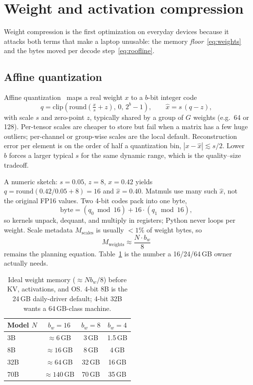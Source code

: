\section{Weight and activation compression}
\label{sec:weights}

Weight compression is the first optimization on everyday devices because it attacks both terms that make a laptop unusable: the memory \emph{floor}~\eqref{eq:weights} and the bytes moved per decode step~\eqref{eq:roofline}.

\subsection{Affine quantization}

Affine quantization~\citep{jacob2018quantization} maps a real weight \(x\) to a \(b\)-bit integer code
\begin{equation}
  q = \mathrm{clip}\!\left(\mathrm{round}\!\left(\tfrac{x}{s}+z\right),\, 0,\, 2^{b}-1\right),
  \qquad
  \hat{x} = s\,(q-z),
\end{equation}
with scale \(s\) and zero-point \(z\), typically shared by a group of \(G\) weights (e.g.\ 64 or 128). Per-tensor scales are cheaper to store but fail when a matrix has a few huge outliers; per-channel or group-wise scales are the local default. Reconstruction error per element is on the order of half a quantization bin, \(|x-\hat{x}| \lesssim s/2\). Lower \(b\) forces a larger typical \(s\) for the same dynamic range, which is the quality--size tradeoff.

A numeric sketch: \(s=0.05\), \(z=8\), \(x=0.42\) yields \(q=\mathrm{round}(0.42/0.05+8)=16\) and \(\hat{x}=0.40\). Matmuls use many such \(\hat{x}\), not the original FP16 values. Two 4-bit codes pack into one byte,
\[
\mathrm{byte} = (q_0 \bmod 16) + 16\cdot (q_1 \bmod 16),
\]
so kernels unpack, dequant, and multiply in registers; Python never loops per weight. Scale metadata \(M_{\mathrm{scales}}\) is usually \(<1\%\) of weight bytes, so
\[
M_{\mathrm{weights}} \approx \frac{N\cdot b_w}{8}
\]
remains the planning equation. Table~\ref{tab:wmem} is the number a 16/24/64\,GB owner actually needs.

\begin{table}[t]
  \centering
  \small
  \caption{Ideal weight memory (\(\approx N b_w/8\)) before KV, activations, and OS. 4-bit 8B is the 24\,GB daily-driver default; 4-bit 32B wants a 64\,GB-class machine.}
  \label{tab:wmem}
  \begin{tabular}{@{}lccc@{}}
    \toprule
    Model \(N\) & \(b_w=16\) & \(b_w=8\) & \(b_w=4\) \\
    \midrule
    3B & \(\approx 6\)\,GB & 3\,GB & 1.5\,GB \\
    8B & \(\approx 16\)\,GB & 8\,GB & 4\,GB \\
    32B & \(\approx 64\)\,GB & 32\,GB & 16\,GB \\
    70B & \(\approx 140\)\,GB & 70\,GB & 35\,GB \\
    \bottomrule
  \end{tabular}
\end{table}

